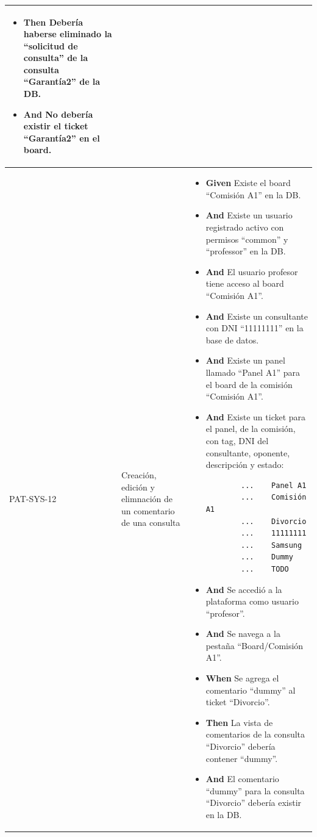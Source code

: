 \begin{longtable}{|p{1cm}|p{2.5cm}|p{12cm}|}
\begin{itemize}
        \item \textbf{Then} Debería haberse eliminado la ``solicitud de consulta'' de la consulta ``Garant\'ia2'' de la DB.
        \item \textbf{And} No debería existir el ticket ``Garant\'ia2'' en el board.
        \newline
    \end{itemize}
    \\ 
    \hline
     PAT-SYS-12 & Creación, edición y elimnación de un comentario de una consulta & 
        \begin{itemize}
        \item \textbf{Given} Existe el board ``Comisión A1'' en la DB.
        \item \textbf{And} Existe un usuario registrado activo con permisos ``common'' y ``professor'' en la DB.
        \item \textbf{And} El usuario profesor tiene acceso al board ``Comisión A1''.
        \item \textbf{And} Existe un consultante con DNI ``11111111'' en la base de datos.
        \item \textbf{And} Existe un panel llamado ``Panel A1'' para el board de la comisión ``Comisión A1''.
        \item \textbf{And} Existe un ticket para el panel, de la comisión, con tag, DNI del consultante, oponente, descripción y estado:
        \begin{verbatim}
        ...    Panel A1
        ...    Comisión A1
        ...    Divorcio
        ...    11111111
        ...    Samsung
        ...    Dummy
        ...    TODO
        \end{verbatim}
        \item \textbf{And} Se accedió a la plataforma como usuario ``profesor''.
        \item \textbf{And} Se navega a la pestaña ``Board/Comisión A1''.
        \newline
    
        \item \textbf{When} Se agrega el comentario ``dummy'' al ticket ``Divorcio''.
        \newline
    
        \item \textbf{Then} La vista de comentarios de la consulta ``Divorcio'' debería contener ``dummy''.
        \item \textbf{And} El comentario ``dummy'' para la consulta ``Divorcio'' debería existir en la DB.
        \newline


\end{itemize}
\end{longtable}
